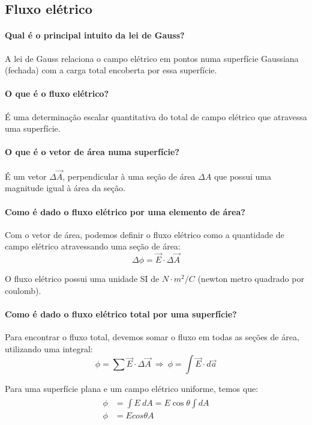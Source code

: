 
\begin{multicols*}{2}

\section*{Fluxo elétrico}

  \paragraph{Qual é o principal intuito da lei de Gauss?} A lei de Gauss relaciona o campo elétrico em pontos numa superfície Gaussiana (fechada) com a carga total encoberta por essa superfície.

  \paragraph{O que é o fluxo elétrico?} É uma determinação escalar quantitativa do total de campo elétrico que atravessa uma superfície. 

  \paragraph{O que é o vetor de área numa superfície?} É um vetor $ \Delta \vec{A} $, perpendicular à uma seção de área $ \Delta A $ que possui uma magnitude igual à área da seção.

  \paragraph{Como é dado o fluxo elétrico por uma elemento de área?} Com o vetor de área, podemos definir o fluxo elétrico como a quantidade de campo elétrico atravessando uma seção de área:
  \[
    \Delta \phi = \vec{E} \cdot \Delta \vec{A}
  \]

  O fluxo elétrico possui uma unidade SI de $ N \cdot m^2/C $ (newton metro quadrado por coulomb).

  \paragraph{Como é dado o fluxo elétrico total por uma superfície?} Para encontrar o fluxo total, devemos somar o fluxo em todas as seções de área, utilizando uma integral:
  \[
    \phi = \sum \vec{E} \cdot \Delta \vec{A} \ \Rightarrow \ \phi = \int \vec{E} \cdot d \vec{a}
  \]

  Para uma superfície plana e um campo elétrico uniforme, temos que: 
  \begin{gather}
    \begin{align}
      \phi &= \int E \ dA = E \cos{\theta} \int dA \\
      \phi &= E cos \theta A
    \end{align}
  \end{gather}


\end{multicols*}
